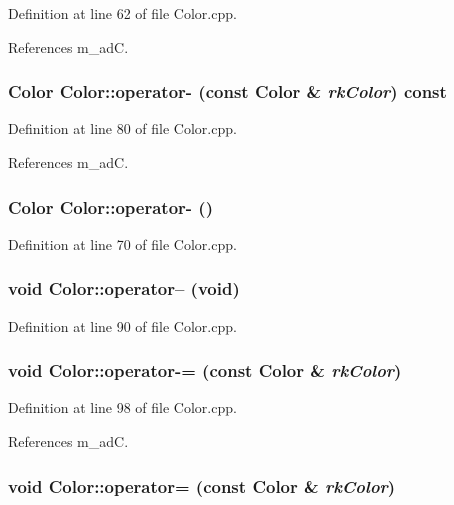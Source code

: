 Definition at line 62 of file Color.cpp.

References m\_\-ad\-C.
\subsubsection{\setlength{\rightskip}{0pt plus 5cm}Color Color::operator- (const Color \& {\em rk\-Color}) const}\label{classdg_1_1Color_a32}




Definition at line 80 of file Color.cpp.

References m\_\-ad\-C.
\subsubsection{\setlength{\rightskip}{0pt plus 5cm}Color Color::operator- ()}\label{classdg_1_1Color_a31}




Definition at line 70 of file Color.cpp.
\subsubsection{\setlength{\rightskip}{0pt plus 5cm}void Color::operator-- (void)}\label{classdg_1_1Color_a33}




Definition at line 90 of file Color.cpp.
\subsubsection{\setlength{\rightskip}{0pt plus 5cm}void Color::operator-= (const Color \& {\em rk\-Color})}\label{classdg_1_1Color_a34}




Definition at line 98 of file Color.cpp.

References m\_\-ad\-C.
\subsubsection{\setlength{\rightskip}{0pt plus 5cm}void Color::operator= (const Color \& {\em rk\-Color})}\label{classdg_1_1Color_a25}




